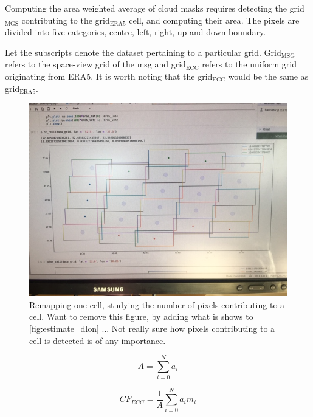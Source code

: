Computing the area weighted average of cloud masks requires detecting the grid$_{\text{MGS}}$ contributing to the grid$_{\text{ERA5}}$ cell, and computing their area. The pixels are divided into five categories, centre, left, right, up and down boundary. 

Let the subscripts denote the dataset pertaining to a particular grid. Grid$_{\text{MSG}}$ refers to the space-view grid of the \acrlong{msg} and grid$_{\text{ECC}}$ refers to the uniform grid originating from ERA5. It is worth noting that the grid$_{\text{ECC}}$ would be the same as grid$_{\text{ERA5}}$.
\begin{figure}
    \centering
    \includegraphics[scale = 0.6]{Chapter4_Results/figurs/remapping-pixels.JPG}
    \caption{Remapping one cell, studying the number of pixels contributing to a cell. Want to remove this figure, by adding what is shows to \ref{fig:estimate_dlon} ...  Not really sure how pixels contributing to a cell is detected is of any importance.} 
    \label{fig:pixels_contributing_to_cell.}
\end{figure}

\begin{equation} \label{eq:tot_area}
    A = \sum_{i=0}^{N} a_i
\end{equation}

\begin{equation} \label{eq:area_weighting}
    CF_{ECC} = \frac{1}{A} \sum_{i=0}^{N} a_i m_i
\end{equation}

